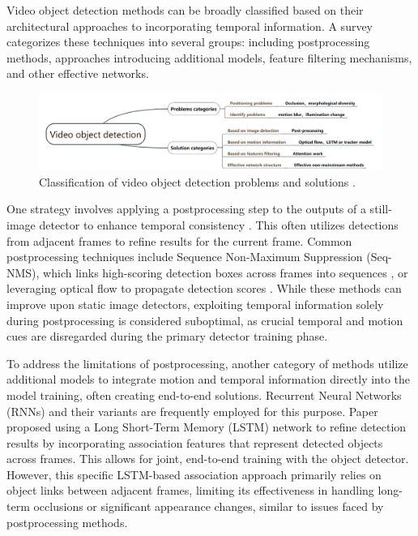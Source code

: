 Video object detection methods can be broadly classified based on their architectural approaches to incorporating temporal information. A survey \cite{jiaoNewGenerationDeep2022} categorizes these techniques into several groups: including postprocessing methods, approaches introducing additional models, feature filtering mechanisms, and other effective networks.

\begin{figure}
    \centering
    \includegraphics[width=\textwidth]{figures/figure_background_vod_classification.png}
    \caption{Classification of video object detection problems and solutions \cite{jiaoNewGenerationDeep2022}.}
    \label{fig:figure_background_vod_classification}
\end{figure}


One strategy involves applying a postprocessing step to the outputs of a still-image detector to enhance temporal consistency \cite{hanSeqNMSVideoObject2016, kangTCNNTubeletsConvolutional2018, kangObjectDetectionVideo2016}. This often utilizes detections from adjacent frames to refine results for the current frame. Common postprocessing techniques include Sequence Non-Maximum Suppression (Seq-NMS), which links high-scoring detection boxes across frames into sequences \cite{hanSeqNMSVideoObject2016}, or leveraging optical flow to propagate detection scores \cite{kangTCNNTubeletsConvolutional2018, kangObjectDetectionVideo2016}. While these methods can improve upon static image detectors, exploiting temporal information solely during postprocessing is considered suboptimal, as crucial temporal and motion cues are disregarded during the primary detector training phase.

To address the limitations of postprocessing, another category of methods utilize additional models to integrate motion and temporal information directly into the model training, often creating end-to-end solutions. Recurrent Neural Networks (RNNs) and their variants are frequently employed for this purpose. Paper \cite{Lu_2017_ICCV} proposed using a Long Short-Term Memory (LSTM) network \cite{6795963} to refine detection results by incorporating association features that represent detected objects across frames. This allows for joint, end-to-end training with the object detector. However, this specific LSTM-based association approach primarily relies on object links between adjacent frames, limiting its effectiveness in handling long-term occlusions or significant appearance changes, similar to issues faced by postprocessing methods.

